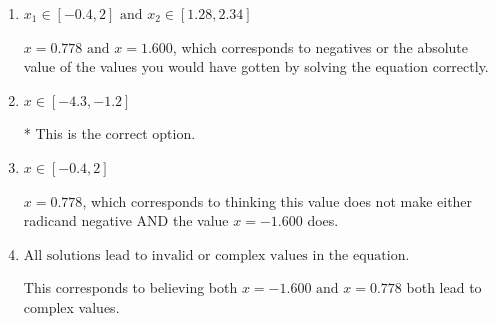 \documentclass{extbook}[14pt]
\begin{document}
\begin{enumerate}
{\begin{enumerate}[label=\Alph*.]
$x = -1.600 \text{ and } x = 0.778$, which corresponds to not checking that $x = 0.778$ leads to a negative in at least one of the radicands.
\item \( x_1 \in [-0.4, 2] \text{ and } x_2 \in [1.28,2.34] \)

$x = 0.778 \text{ and } x = 1.600$, which corresponds to negatives or the absolute value of the values you would have gotten by solving the equation correctly.
\item \( x \in [-4.3,-1.2] \)

* This is the correct option.
\item \( x \in [-0.4,2] \)

$x = 0.778$, which corresponds to thinking this value does not make either radicand negative AND the value $x = -1.600$ does.
\item \( \text{All solutions lead to invalid or complex values in the equation.} \)

This corresponds to believing both $x = -1.600 \text{ and } x = 0.778$ both lead to complex values.
\end{enumerate}

}
\end{enumerate}
\end{document}
